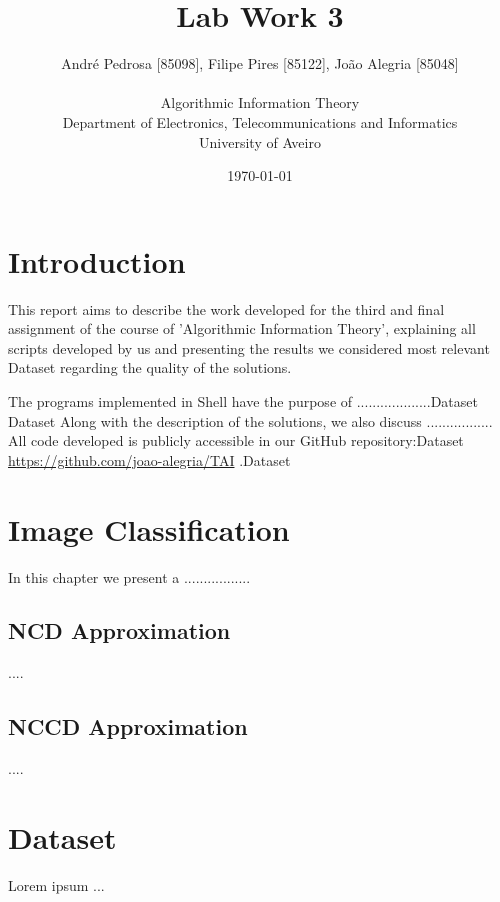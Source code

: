 \documentclass[12pt]{article}
\title{Lab Work 3}
\author
{André Pedrosa [85098], Filipe Pires [85122], João Alegria [85048]\\
\\
Algorithmic Information Theory\\
\normalsize{Department of Electronics, Telecommunications and Informatics}\\
\normalsize{University of Aveiro}\\
}
\date{\today{}}
\begin{document}
 

\baselineskip18pt

\maketitle 

\section{Introduction}
This report aims to describe the work developed for the third and final assignment
of the course of 'Algorithmic Information Theory', explaining all scripts
developed by us and presenting the results we considered most relevant Dataset
regarding the quality of the solutions. 

The programs implemented in Shell have the purpose of ...................Dataset
Dataset
Along with the description of the solutions, we also discuss .................
All code developed is publicly accessible in our GitHub repository:Dataset
\url{https://github.com/joao-alegria/TAI} .Dataset
\newpage

\section{Image Classification}
In this chapter we present a ................\cite{trab3}.

\subsection{NCD Approximation}
....

\subsection{NCCD Approximation}
....

\section{Dataset}
Lorem ipsum ...

\end{document}
